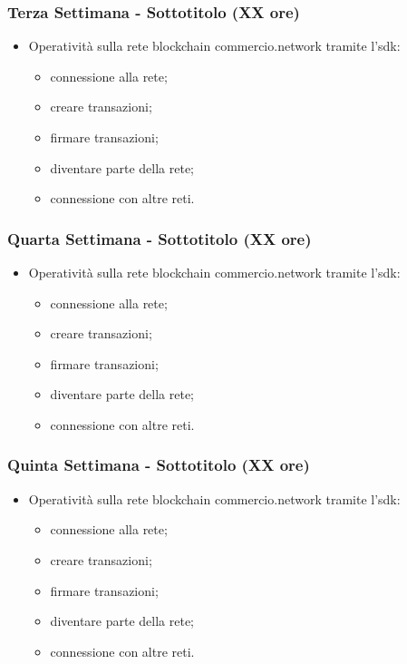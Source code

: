 {    \subsubsection{Terza Settimana - Sottotitolo (XX ore)} 
    \begin{itemize}
        \item Operatività sulla rete blockchain commercio.network tramite l'sdk:
        \begin{itemize}
           	\item connessione alla rete;
           	\item creare transazioni;
           	\item firmare transazioni;
           	\item diventare parte della rete;
           	\item connessione con altre reti.
        \end{itemize}
    \end{itemize}

    \subsubsection{Quarta Settimana - Sottotitolo (XX ore)} 
    \begin{itemize}
        \item Operatività sulla rete blockchain commercio.network tramite l'sdk:
        \begin{itemize}
           	\item connessione alla rete;
           	\item creare transazioni;
           	\item firmare transazioni;
           	\item diventare parte della rete;
           	\item connessione con altre reti.
        \end{itemize}
    \end{itemize}

    \subsubsection{Quinta Settimana - Sottotitolo (XX ore)} 
    \begin{itemize}
        \item Operatività sulla rete blockchain commercio.network tramite l'sdk:
        \begin{itemize}
           	\item connessione alla rete;
           	\item creare transazioni;
           	\item firmare transazioni;
           	\item diventare parte della rete;
           	\item connessione con altre reti.
        \end{itemize}
    \end{itemize}

}
